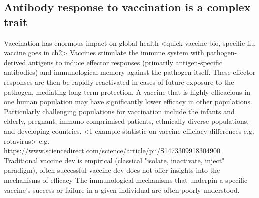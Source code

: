 \begin{outline}
\subsection{Antibody response to vaccination is a complex trait}

\1 Vaccination has enormous impact on global health \autocite{greenwood2014ContributionVaccinationGlobal}
    \2 <quick vaccine bio, specific flu vaccine goes in ch2>
        \3 Vaccines stimulate the immune system with pathogen-derived antigens to induce effector responses (primarily antigen-specific antibodies) and immunological memory against the pathogen itself.
        \3 These effector responses are then be rapidly reactivated in cases of future exposure to the pathogen, mediating long-term protection.
    \2 A vaccine that is highly efficacious in one human population may have significantly lower efficacy in other populations.
    Particularly challenging populations for vaccination include the infants and elderly, pregnant, immuno comprimised patients, ethnically-diverse populations, and developing countries.
        \3 <1 example statistic on vaccine efficiacy differences e.g. rotavirus>
        \3 e.g. \url{https://www.sciencedirect.com/science/article/pii/S1473309918304900}
    \2 Traditional vaccine dev is empirical (classical "isolate, inactivate, inject" paradigm), often successful vaccine dev does not offer insights into the mechanisms of efficacy 
    \2 The immunological mechanisms that underpin a specific vaccine's success or failure in a given individual are often poorly understood.



\end{outline}
